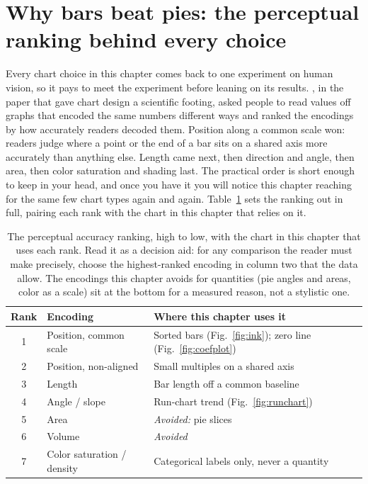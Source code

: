 \section{Why bars beat pies: the perceptual ranking behind every choice}\label{sec:perception}
Every chart choice in this chapter comes back to one experiment on human vision, so it pays to meet the experiment before leaning on its results. \textcite{cleveland1984graphical}, in the paper that gave chart design a scientific footing, asked people to read values off graphs that encoded the same numbers different ways and ranked the encodings by how accurately readers decoded them. Position along a common scale won: readers judge where a point or the end of a bar sits on a shared axis more accurately than anything else. Length came next, then direction and angle, then area, then color saturation and shading last. The practical order is short enough to keep in your head, and once you have it you will notice this chapter reaching for the same few chart types again and again. Table~\ref{tab:ch09-viz-ranking} sets the ranking out in full, pairing each rank with the chart in this chapter that relies on it.

\begin{table}[htbp]
\centering
\caption[The Cleveland--McGill encoding ranking, mapped to this chapter]{The perceptual accuracy ranking, high to low, with the chart in this chapter that uses each rank. Read it as a decision aid: for any comparison the reader must make precisely, choose the highest-ranked encoding in column two that the data allow. The encodings this chapter avoids for quantities (pie angles and areas, color as a scale) sit at the bottom for a measured reason, not a stylistic one.}
\label{tab:ch09-viz-ranking}
\footnotesize
\begin{tabular}{@{}clp{9.6cm}@{}}
\toprule
Rank & Encoding & Where this chapter uses it \\
\midrule
1 & Position, common scale     & Sorted bars (Fig.~\ref{fig:ink}); zero line (Fig.~\ref{fig:coefplot}) \\
2 & Position, non-aligned      & Small multiples on a shared axis \\
3 & Length                     & Bar length off a common baseline \\
4 & Angle / slope              & Run-chart trend (Fig.~\ref{fig:runchart}) \\
5 & Area                       & \emph{Avoided:} pie slices \\
6 & Volume                     & \emph{Avoided} \\
7 & Color saturation / density & Categorical labels only, never a quantity \\
\bottomrule
\end{tabular}
\end{table}


